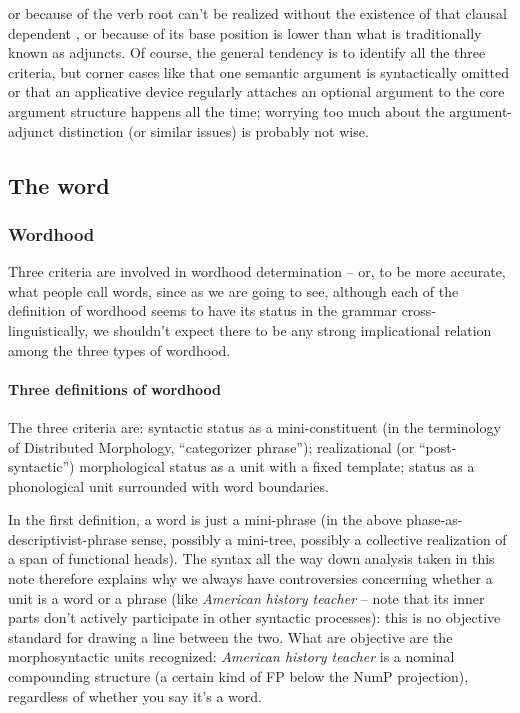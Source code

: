 \documentclass[a4paper, oneside, 12pt]{report}
\newcommand*{\citechap}[1]{chap.~{#1}}
\newcommand{\form}[1]{\emph{#1}}
\begin{document}
{\begin{itemize}
        or because of the verb root can't be realized 
        without the existence of that clausal dependent
        \citep[\citechap{9}]{siddiqi2009syntax},
        or because of its base position is lower than what is traditionally 
        known as adjuncts.
        Of course, the general tendency is to identify all the three criteria,
        but corner cases like 
        that one semantic argument is syntactically omitted
        or that an applicative device regularly
        attaches an optional argument to the core argument structure
        happens all the time; 
        worrying too much about the argument-adjunct distinction 
        (or similar issues) is probably not wise.
\end{itemize}

\subsection{The word}

\subsubsection{Wordhood}

Three criteria are involved in wordhood determination -- 
or, to be more accurate, what people call words,
since as we are going to see, 
although each of the definition of wordhood 
seems to have its status in the grammar cross-linguistically,
we shouldn't expect there to be any strong implicational relation 
among the three types of wordhood.

\paragraph{Three definitions of wordhood} The three criteria are: 
syntactic status as a mini-constituent 
(in the terminology of Distributed Morphology, ``categorizer phrase'');
realizational (or ``post-syntactic'') morphological  status 
as a unit with a fixed template;
status as a phonological unit surrounded with word boundaries.

In the first definition, a word is just a mini-phrase 
(in the above phase-as-descriptivist-phrase sense, 
possibly a mini-tree, possibly a collective realization of a span of functional heads).
The syntax all the way down analysis taken in this note 
therefore explains why we always have controversies 
concerning whether a unit is a word or a phrase 
(like \form{American history teacher} 
-- note that its inner parts don't actively participate in other syntactic processes):
this is no objective standard for drawing a line between the two. 
What are objective are the morphosyntactic units recognized: 
\form{American history teacher} is a nominal compounding structure 
(a certain kind of FP below the NumP projection),
regardless of whether you say it's a word. 

}
\end{document}

